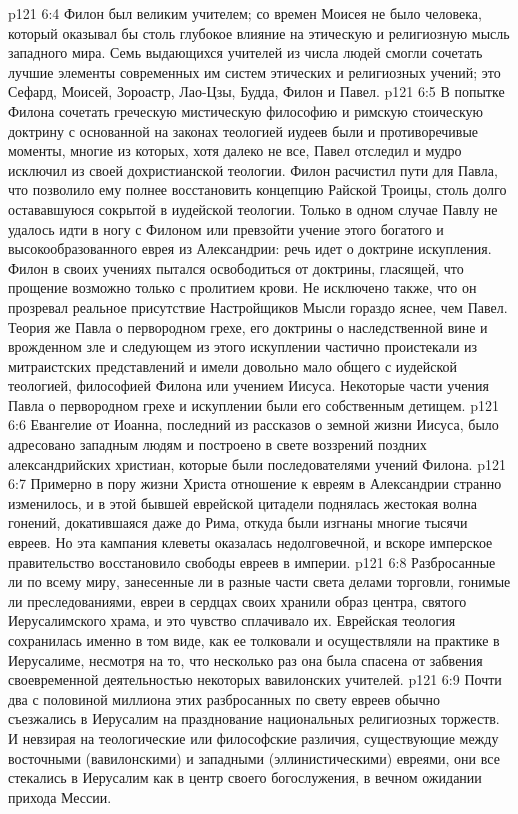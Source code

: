 \vs p121 6:4 Филон был великим учителем; со времен Моисея не было человека, который оказывал бы столь глубокое влияние на этическую и религиозную мысль западного мира. Семь выдающихся учителей из числа людей смогли сочетать лучшие элементы современных им систем этических и религиозных учений; это Сефард, Моисей, Зороастр, Лао\hyp{}Цзы, Будда, Филон и Павел.
\vs p121 6:5 В попытке Филона сочетать греческую мистическую философию и римскую стоическую доктрину с основанной на законах теологией иудеев были и противоречивые моменты, многие из которых, хотя далеко не все, Павел отследил и мудро исключил из своей дохристианской теологии. Филон расчистил пути для Павла, что позволило ему полнее восстановить концепцию Райской Троицы, столь долго остававшуюся сокрытой в иудейской теологии. Только в одном случае Павлу не удалось идти в ногу с Филоном или превзойти учение этого богатого и высокообразованного еврея из Александрии: речь идет о доктрине искупления. Филон в своих учениях пытался освободиться от доктрины, гласящей, что прощение возможно только с пролитием крови. Не исключено также, что он прозревал реальное присутствие Настройщиков Мысли гораздо яснее, чем Павел. Теория же Павла о первородном грехе, его доктрины о наследственной вине и врожденном зле и следующем из этого искуплении частично проистекали из митраистских представлений и имели довольно мало общего с иудейской теологией, философией Филона или учением Иисуса. Некоторые части учения Павла о первородном грехе и искуплении были его собственным детищем.
\vs p121 6:6 Евангелие от Иоанна, последний из рассказов о земной жизни Иисуса, было адресовано западным людям и построено в свете воззрений поздних александрийских христиан, которые были последователями учений Филона.
\vs p121 6:7 \pc Примерно в пору жизни Христа отношение к евреям в Александрии странно изменилось, и в этой бывшей еврейской цитадели поднялась жестокая волна гонений, докатившаяся даже до Рима, откуда были изгнаны многие тысячи евреев. Но эта кампания клеветы оказалась недолговечной, и вскоре имперское правительство восстановило свободы евреев в империи.
\vs p121 6:8 Разбросанные ли по всему миру, занесенные ли в разные части света делами торговли, гонимые ли преследованиями, евреи в сердцах своих хранили образ центра, святого Иерусалимского храма, и это чувство сплачивало их. Еврейская теология сохранилась именно в том виде, как ее толковали и осуществляли на практике в Иерусалиме, несмотря на то, что несколько раз она была спасена от забвения своевременной деятельностью некоторых вавилонских учителей.
\vs p121 6:9 Почти два с половиной миллиона этих разбросанных по свету евреев обычно съезжались в Иерусалим на празднование национальных религиозных торжеств. И невзирая на теологические или философские различия, существующие между восточными (вавилонскими) и западными (эллинистическими) евреями, они все стекались в Иерусалим как в центр своего богослужения, в вечном ожидании прихода Мессии.
